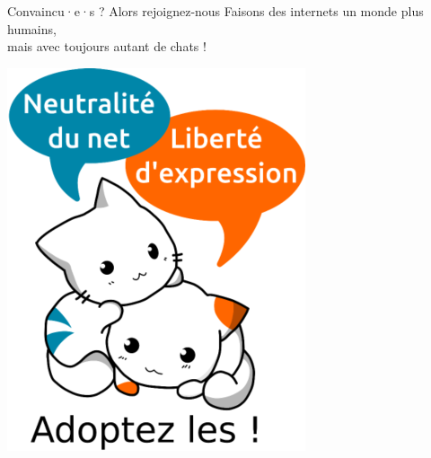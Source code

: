 \begin{frame}{Convaincu·e·s ? Alors rejoignez-nous}
  \centering
  Faisons des internets un monde plus humains, \\
  mais avec toujours autant de chats !

  \includegraphics[height=0.7\textheight]{un_autre_internet/adoptez_les.png}
\end{frame}

